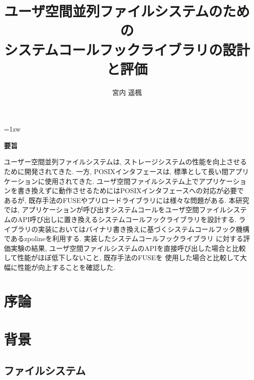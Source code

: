\documentclass[a4paper,11pt]{jreport}
\title{ユーザ空間並列ファイルシステムのための\\システムコールフックライブラリの設計と評価}
\author{宮内 遥楓}
\begin{document}
\maketitle
\thispagestyle{empty}
\newpage

\thispagestyle{empty}
\vspace*{20pt plus 1fil}
\parindent=1zw
\noindent
\begin{center}
{\Large \bf 要旨}
\vspace{2cm}
\end{center}
ユーザー空間並列ファイルシステムは, ストレージシステムの性能を向上させるために開発されてきた. 
一方, POSIXインタフェースは, 標準として長い間アプリケーションに使用されてきた.
ユーザ空間ファイルシステム上でアプリケーションを書き換えずに動作させるためにはPOSIXインタフェースへの対応が必要であるが, 
既存手法のFUSEやプリロードライブラリには様々な問題がある.
本研究では, アプリケーションが呼び出すシステムコールをユーザ空間ファイルシステムのAPI呼び出しに置き換えるシステムコールフックライブラリを設計する.
ライブラリの実装においてはバイナリ書き換えに基づくシステムコールフック機構であるzpolineを利用する. 実装したシステムコールフックライブラリ
に対する評価実験の結果, ユーザ空間ファイルシステムのAPIを直接呼び出した場合と比較して性能がほぼ低下しないこと, 既存手法のFUSEを
使用した場合と比較して大幅に性能が向上することを確認した.

\par
\vspace{0pt plus 1fil}
\newpage

\tableofcontents
\listoffigures

\pagebreak \setcounter{page}{1}

\chapter{序論}


\chapter{背景}

\section{ファイルシステム}
\end{document}
